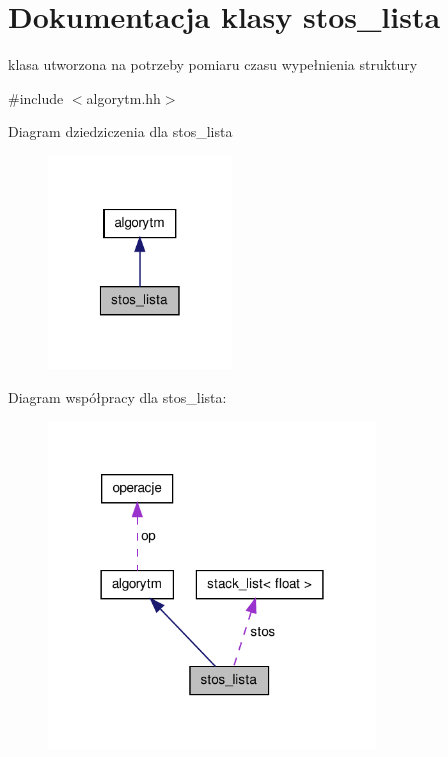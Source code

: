 \hypertarget{classstos__lista}{\section{\-Dokumentacja klasy stos\-\_\-lista}
\label{classstos__lista}
}


klasa utworzona na potrzeby pomiaru czasu wypełnienia struktury  




{\ttfamily \#include $<$algorytm.\-hh$>$}



\-Diagram dziedziczenia dla stos\-\_\-lista
\nopagebreak
\begin{figure}[H]
\begin{center}
\leavevmode
\includegraphics[width=138pt]{classstos__lista__inherit__graph}
\end{center}
\end{figure}


\-Diagram współpracy dla stos\-\_\-lista\-:
\nopagebreak
\begin{figure}[H]
\begin{center}
\leavevmode
\includegraphics[width=246pt]{classstos__lista__coll__graph}
\end{center}
\end{figure}
